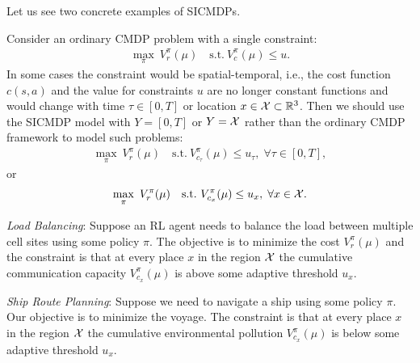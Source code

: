 Let us see two concrete examples of SICMDPs.  
\begin{example}\label{Example_Time_Evolving}
Consider an ordinary CMDP problem with a single constraint:
\begin{equation}\label{Problem_CMDP_Single_Constraint}
\begin{aligned}
\max_{\pi}\ V_r^\pi(\mu)\quad
\text{s.t.}\ V_c^\pi(\mu) \leq u.
\end{aligned}
\end{equation}
In some cases the constraint would be spatial-temporal, i.e., the cost function $c(s,a)$ and the value for constraints $u$ are no longer constant functions and would change with time $\tau \in[0,T]$ or location $x\in {\mathcal{X}}\subset{\mathbb R}^3$.
Then we should use the SICMDP model with $Y=[0,T]$ or $Y={\mathcal{X}}$ rather than the ordinary CMDP framework to model such problems:
\begin{equation}\label{Problem_SICMDP_Time_Evolving}
\begin{aligned}
\max_{\pi}\ V_r^\pi(\mu)\quad
\text{s.t.}\ V_{c_\tau}^\pi(\mu) \leq u_\tau, \; \forall \tau \in [0,T],
\end{aligned}
\end{equation}
or
\begin{equation}\label{Problem_SICMDP_Space}
\begin{aligned}
\max_{\pi}\ V_r^\pi(\mu)\quad
\text{s.t.}\ V_{c_x}^\pi(\mu) \leq u_x, \; \forall x \in {\mathcal{X}}.
\end{aligned}
\end{equation}

\textit{Load Balancing}: Suppose an RL agent needs to balance the load between multiple cell sites using some policy $\pi$.
The objective is to minimize the cost $V_r^\pi(\mu)$ and the constraint is that at every place $x$ in the region ${\mathcal{X}}$ the cumulative communication capacity $V_{c_x}^\pi(\mu)$ is above some adaptive threshold $u_x$.

\textit{Ship Route Planning}: Suppose we need to navigate a ship using some policy $\pi$.
Our objective is to minimize the voyage.
The constraint is that at every place $x$ in the region ${\mathcal{X}}$ the cumulative environmental pollution $V_{c_x}^\pi(\mu)$ is below some adaptive threshold $u_x$.
\end{example}


